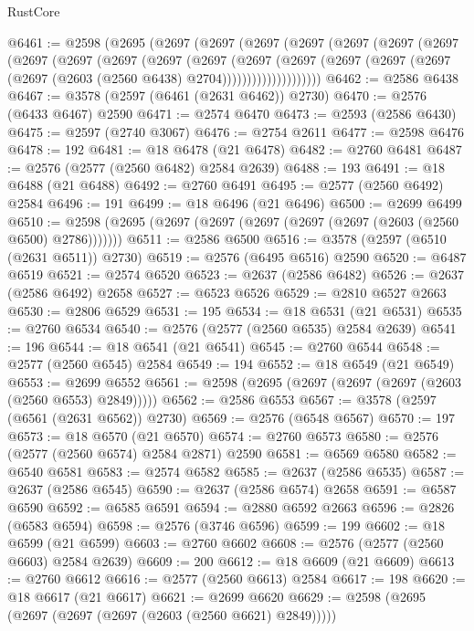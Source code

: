 \begin{lexlean}{RustCore}
\begin{coremodule}
@6461 := @2598
    (@2695
      (@2697
        (@2697
          (@2697
            (@2697
              (@2697
                (@2697
                  (@2697
                    (@2697
                      (@2697
                        (@2697
                          (@2697
                            (@2697
                              (@2697
                                (@2697
                                  (@2697
                                    (@2697
                                      (@2697 (@2697 (@2603 (@2560 @6438) @2704))))))))))))))))))))
@6462 := @2586 @6438
@6467 := @3578 (@2597 (@6461 (@2631 @6462)) @2730)
@6470 := @2576 (@6433 @6467) @2590
@6471 := @2574 @6470
@6473 := @2593 (@2586 @6430)
@6475 := @2597 (@2740 @3067)
@6476 := @2754 @2611
@6477 := @2598 @6476
@6478 := 192
@6481 := @18 @6478 (@21 @6478)
@6482 := @2760 @6481
@6487 := @2576 (@2577 (@2560 @6482) @2584 @2639)
@6488 := 193
@6491 := @18 @6488 (@21 @6488)
@6492 := @2760 @6491
@6495 := @2577 (@2560 @6492) @2584
@6496 := 191
@6499 := @18 @6496 (@21 @6496)
@6500 := @2699 @6499
@6510 := @2598 (@2695 (@2697 (@2697 (@2697 (@2697 (@2697 (@2603 (@2560 @6500) @2786)))))))
@6511 := @2586 @6500
@6516 := @3578 (@2597 (@6510 (@2631 @6511)) @2730)
@6519 := @2576 (@6495 @6516) @2590
@6520 := @6487 @6519
@6521 := @2574 @6520
@6523 := @2637 (@2586 @6482)
@6526 := @2637 (@2586 @6492) @2658
@6527 := @6523 @6526
@6529 := @2810 @6527 @2663
@6530 := @2806 @6529
@6531 := 195
@6534 := @18 @6531 (@21 @6531)
@6535 := @2760 @6534
@6540 := @2576 (@2577 (@2560 @6535) @2584 @2639)
@6541 := 196
@6544 := @18 @6541 (@21 @6541)
@6545 := @2760 @6544
@6548 := @2577 (@2560 @6545) @2584
@6549 := 194
@6552 := @18 @6549 (@21 @6549)
@6553 := @2699 @6552
@6561 := @2598 (@2695 (@2697 (@2697 (@2697 (@2603 (@2560 @6553) @2849)))))
@6562 := @2586 @6553
@6567 := @3578 (@2597 (@6561 (@2631 @6562)) @2730)
@6569 := @2576 (@6548 @6567)
@6570 := 197
@6573 := @18 @6570 (@21 @6570)
@6574 := @2760 @6573
@6580 := @2576 (@2577 (@2560 @6574) @2584 @2871) @2590
@6581 := @6569 @6580
@6582 := @6540 @6581
@6583 := @2574 @6582
@6585 := @2637 (@2586 @6535)
@6587 := @2637 (@2586 @6545)
@6590 := @2637 (@2586 @6574) @2658
@6591 := @6587 @6590
@6592 := @6585 @6591
@6594 := @2880 @6592 @2663
@6596 := @2826 (@6583 @6594)
@6598 := @2576 (@3746 @6596)
@6599 := 199
@6602 := @18 @6599 (@21 @6599)
@6603 := @2760 @6602
@6608 := @2576 (@2577 (@2560 @6603) @2584 @2639)
@6609 := 200
@6612 := @18 @6609 (@21 @6609)
@6613 := @2760 @6612
@6616 := @2577 (@2560 @6613) @2584
@6617 := 198
@6620 := @18 @6617 (@21 @6617)
@6621 := @2699 @6620
@6629 := @2598 (@2695 (@2697 (@2697 (@2697 (@2603 (@2560 @6621) @2849)))))

\end{coremodule}
\end{lexlean}
